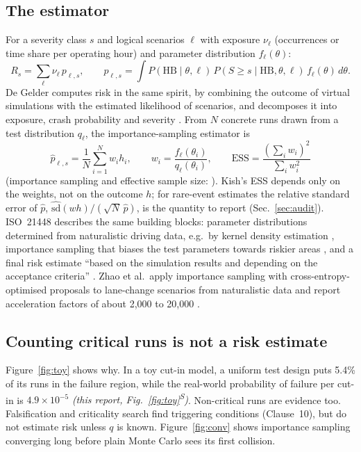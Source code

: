 \documentclass[11pt,a4paper]{article}
\newcommand{\own}[1]{\textit{(this report, #1)}}
\newcommand{\synthetic}{\textsuperscript{\textsf{S}}}
\begin{document}
\subsection{The estimator}
For a severity class $s$ and logical scenarios $\ell$ with exposure $\nu_\ell$ (occurrences or time share per operating hour) and parameter distribution $f_\ell(\theta)$:
\begin{equation}
R_s=\sum_\ell \nu_\ell\,p_{\ell,s},\qquad p_{\ell,s}=\int P(\mathrm{HB}\mid\theta,\ell)\,P(S\ge s\mid\mathrm{HB},\theta,\ell)\,f_\ell(\theta)\,d\theta .
\label{eq:risk}
\end{equation}
De Gelder computes risk in the same spirit, by combining the outcome of virtual simulations with the estimated likelihood of scenarios, and decomposes it into exposure, crash probability and severity \cite[Ch.~1 and Ch.~7, Secs.~7.3.2, 7.3.4, 7.3.5]{degelder2022}. From $N$ concrete runs drawn from a test distribution $q_\ell$, the importance-sampling estimator is
\begin{equation}
\hat p_{\ell,s}=\frac1N\sum_{i=1}^N w_i h_i,\qquad w_i=\frac{f_\ell(\theta_i)}{q_\ell(\theta_i)},\qquad \mathrm{ESS}=\frac{(\sum_i w_i)^2}{\sum_i w_i^2}
\label{eq:is}
\end{equation}
(importance sampling and effective sample size: \cite[Ch.~9]{owen2013}). Kish's ESS depends only on the weights, not on the outcome $h$; for rare-event estimates the relative standard error of $\hat p$, $\widehat{\mathrm{sd}}(w h)/(\sqrt N\,\hat p)$, is the quantity to report (Sec.~\ref{sec:audit}). ISO~21448 describes the same building blocks: parameter distributions determined from naturalistic driving data, e.g.\ by kernel density estimation \cite[C.5, Figures~C.9--C.11, pp.~146--148]{iso21448}, importance sampling that biases the test parameters towards riskier areas \cite[C.5, Figures~C.12--C.14, pp.~149--151]{iso21448}, and a final risk estimate ``based on the simulation results and depending on the acceptance criteria'' \cite[C.5, p.~151]{iso21448}. Zhao et al.\ apply importance sampling with cross-entropy-optimised proposals to lane-change scenarios from naturalistic data and report acceleration factors of about 2{,}000 to 20{,}000 \cite[Abstract]{zhao2017}.

\subsection{Counting critical runs is not a risk estimate}
Figure~\ref{fig:toy} shows why. In a toy cut-in model, a uniform test design puts 5.4\% of its runs in the failure region, while the real-world probability of failure per cut-in is $4.9\times10^{-5}$ \own{Fig.~\ref{fig:toy}\synthetic}. Non-critical runs are evidence too. Falsification and criticality search find triggering conditions (Clause~10), but do not estimate risk unless $q$ is known. Figure~\ref{fig:conv} shows importance sampling converging long before plain Monte Carlo sees its first collision.
\end{document}
